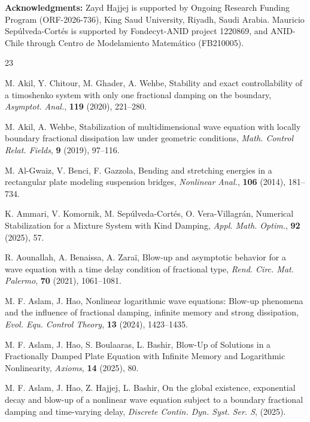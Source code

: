 \documentclass[12pt]{article}
\numberwithin{equation}{section}
\begin{document}
{\bf Acknowledgments:} Zayd Hajjej is supported by Ongoing Research Funding Program (ORF-2026-736), King Saud University, Riyadh, Saudi Arabia.
Mauricio Sepúlveda-Cortés is supported by Fondecyt-ANID project 1220869,
and
ANID-Chile through Centro de Modelamiento  Matem\'atico  (FB210005).
\begin{thebibliography}{23}

M. Akil, Y. Chitour, M. Ghader, A. Wehbe, Stability and exact controllability of a timoshenko system with only one fractional damping on the boundary, {\it Asymptot. Anal.}, \textbf{119} (2020), 221--280.

M. Akil, A. Wehbe, Stabilization of multidimensional wave equation with locally boundary fractional dissipation law under geometric conditions, {\it Math. Control Relat. Fields}, \textbf{9} (2019), 97--116.



M. Al-Gwaiz, V. Benci, F. Gazzola, Bending and stretching energies in a rectangular plate modeling suspension bridges, {\it Nonlinear Anal.}, \textbf{106} (2014), 181--734.

K. Ammari, V. Komornik, M. Sepúlveda-Cortés, O. Vera-Villagr\'an, Numerical Stabilization for a Mixture System with Kind Damping, {\it Appl. Math. Optim.}, \textbf{92} (2025), 57.

R. Aounallah, A. Benaissa, A. Zara\"{i}, Blow-up and asymptotic behavior for a wave equation with a time delay condition of fractional type, {\it Rend. Circ. Mat. Palermo}, \textbf{70} (2021), 1061--1081.

M. F. Aslam, J. Hao, Nonlinear logarithmic wave equations: Blow-up phenomena and the influence of fractional damping, infinite memory and strong dissipation, {\it Evol. Equ. Control Theory}, \textbf{13} (2024), 1423--1435.

M. F. Aslam, J. Hao, S. Boulaaras, L. Bashir, Blow-Up of Solutions in a Fractionally Damped Plate Equation with Infinite Memory and Logarithmic Nonlinearity, {\it Axioms}, \textbf{14} (2025), 80.


M. F. Aslam, J. Hao, Z. Hajjej, L. Bashir, On the global existence, exponential decay and blow-up of a nonlinear wave equation subject to a boundary fractional damping and time-varying delay, {\it Discrete Contin. Dyn. Syst. Ser. S}, (2025).


\end{thebibliography}
\end{document}
